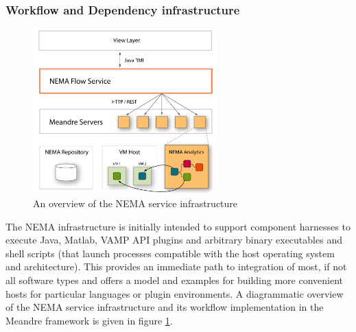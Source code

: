 \documentclass[conference]{IEEEtran}
\begin{document}
\subsubsection{Workflow and Dependency infrastructure}
\begin{figure}[!t]
\centering
\includegraphics[width=2.8in]{infrastructure}
  \caption{An overview of the NEMA service infrastructure}
\label{fig_infrastructure}
\end{figure}
The NEMA infrastructure is initially intended to support component harnesses to execute Java, Matlab, VAMP API plugins \cite{cannam2006sonic} and arbitrary binary executables and shell scripts (that launch processes compatible with the host operating system and architecture). This provides an immediate path to integration of most, if not all software types and offers a model and examples for building more convenient hosts for particular languages or plugin environments. A diagrammatic overview of the NEMA service infrastructure and its workflow implementation in the Meandre framework is given in figure \ref{fig_infrastructure}.
\end{document}
